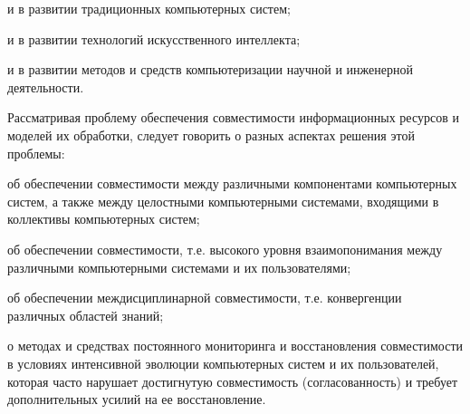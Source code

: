 \begin{SCn}
{\begin{scnitemize}
\item и в развитии традиционных компьютерных систем;
\item и в развитии технологий искусственного интеллекта;
\item и в развитии методов и средств компьютеризации научной и инженерной деятельности.
\end{scnitemize}

Рассматривая проблему обеспечения совместимости информационных ресурсов и моделей их обработки, следует говорить о разных аспектах решения этой проблемы:

\begin{scnitemize}
\item об обеспечении совместимости между различными компонентами компьютерных систем, а также между целостными компьютерными системами, входящими в коллективы компьютерных систем;
\item об обеспечении совместимости, т.е. высокого уровня взаимопонимания между различными компьютерными системами и их пользователями;
\item об обеспечении междисциплинарной совместимости, т.е. конвергенции различных областей знаний;
\item о методах и средствах постоянного мониторинга и восстановления совместимости в условиях интенсивной эволюции компьютерных систем и их пользователей, которая часто нарушает достигнутую совместимость (согласованность) и требует дополнительных усилий на ее восстановление.
\end{scnitemize}}

\end{SCn}
